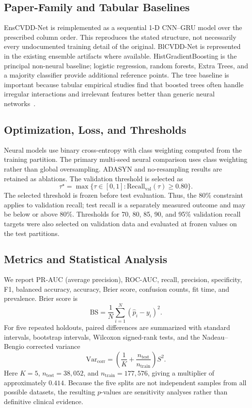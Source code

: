 \documentclass[conference,10pt]{IEEEtran}
\begin{document}
\subsection{Paper-Family and Tabular Baselines}
EnsCVDD-Net is reimplemented as a sequential 1-D CNN--GRU model over the prescribed column order. This reproduces the stated structure, not necessarily every undocumented training detail of the original. BlCVDD-Net is represented in the existing ensemble artifacts where available. HistGradientBoosting is the principal non-neural baseline; logistic regression, random forests, Extra Trees, and a majority classifier provide additional reference points. The tree baseline is important because tabular empirical studies find that boosted trees often handle irregular interactions and irrelevant features better than generic neural networks~\cite{grinsztajn2022tree}.

\subsection{Optimization, Loss, and Thresholds}
Neural models use binary cross-entropy with class weighting computed from the training partition. The primary multi-seed neural comparison uses class weighting rather than global oversampling. ADASYN and no-resampling results are retained as ablations. The validation threshold is selected as
\begin{equation}
\tau^\star=\max\{\tau\in[0,1]:\mathrm{Recall}_{\mathrm{val}}(\tau)\geq0.80\}.
\end{equation}
The selected threshold is frozen before test evaluation. Thus, the 80\% constraint applies to validation recall; test recall is a separately measured outcome and may be below or above 80\%. Thresholds for 70, 80, 85, 90, and 95\% validation recall targets were also selected on validation data and evaluated at frozen values on the test partitions.

\subsection{Metrics and Statistical Analysis}
We report PR-AUC (average precision), ROC-AUC, recall, precision, specificity, F1, balanced accuracy, accuracy, Brier score, confusion counts, fit time, and prevalence. Brier score is
\begin{equation}
\mathrm{BS}=\frac{1}{N}\sum_{i=1}^{N}(\hat{p}_i-y_i)^2.
\end{equation}
For five repeated holdouts, paired differences are summarized with standard intervals, bootstrap intervals, Wilcoxon signed-rank tests, and the Nadeau--Bengio corrected variance
\begin{equation}
\widehat{\mathrm{Var}}_{\mathrm{corr}}=
\left(\frac{1}{K}+\frac{n_{\mathrm{test}}}{n_{\mathrm{train}}}\right)S^2.
\end{equation}
Here $K=5$, $n_{\mathrm{test}}=38{,}052$, and $n_{\mathrm{train}}=177{,}576$, giving a multiplier of approximately $0.414$. Because the five splits are not independent samples from all possible datasets, the resulting $p$-values are sensitivity analyses rather than definitive clinical evidence.
\end{document}
